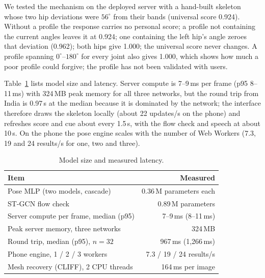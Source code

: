  We tested the mechanism on the deployed server with a hand-built skeleton whose two hip deviations were $56^\circ$ from their bands (universal score 0.924). Without a profile the response carries no personal score; a profile not containing the current angles leaves it at 0.924; one containing the left hip's angle zeroes that deviation (0.962); both hips give 1.000; the universal score never changes. A profile spanning $0^\circ$--$180^\circ$ for every joint also gives 1.000, which shows how much a poor profile could forgive; the profile has not been validated with users.

 Table~\ref{tab:eff} lists model size and latency. Server compute is 7--9\,ms per frame (p95 8--11\,ms) with 324\,MB peak memory for all three networks, but the round trip from India is 0.97\,s at the median because it is dominated by the network; the interface therefore draws the skeleton locally (about 22 updates/s on the phone) and refreshes score and cue about every 1.5\,s, with the flow check and speech at about 10\,s. On the phone the pose engine scales with the number of Web Workers (7.3, 19 and 24 results/s for one, two and three).
\begin{table}[t]
\centering\footnotesize
\caption{Model size and measured latency.}\label{tab:eff}
\begin{tabular}{@{}lr@{}}
\toprule
Item & Measured \\ \midrule
Pose MLP (two models, cascade) & 0.36\,M parameters each \\
ST-GCN flow check & 0.89\,M parameters \\
Server compute per frame, median (p95) & 7--9\,ms (8--11\,ms) \\
Peak server memory, three networks & 324\,MB \\
Round trip, median (p95), $n{=}32$ & 967\,ms (1{,}266\,ms) \\
Phone engine, 1 / 2 / 3 workers & 7.3 / 19 / 24 results/s \\
Mesh recovery (CLIFF), 2 CPU threads & 164\,ms per image \\ \bottomrule
\end{tabular}
\end{table}


